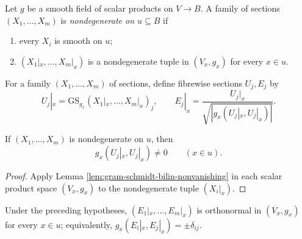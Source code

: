 \begin{definition}
\label{def:local-nondegenerate-family}
\leanok
{}
Let $g$ be a smooth field of scalar products on $V\to B$. A family of sections
$(X_1,\ldots,X_m)$ is \emph{nondegenerate on $u\subseteq B$} if
\begin{enumerate}[label=(\alph*)]
\item every $X_i$ is smooth on $u$;
\item $(X_1|_x,\ldots,X_m|_x)$ is a nondegenerate tuple in $(V_x,g_x)$ for
every $x\in u$.
\end{enumerate}
\end{definition}

\begin{definition}
\label{def:pseudo-gram-schmidt-frame}
\leanok
{}
For a family $(X_1,\ldots,X_m)$ of sections, define fibrewise sections $U_j,E_j$
by
\[
U_j|_x=\mathrm{GS}_{g_x}(X_1|_x,\ldots,X_m|_x)_j,
\qquad
E_j|_x=\frac{U_j|_x}{\sqrt{|g_x(U_j|_x,U_j|_x)|}}.
\]
\end{definition}

\begin{lemma}
\label{lem:pseudo-gram-schmidt-denominators}
\leanok
{}
If $(X_1,\ldots,X_m)$ is nondegenerate on $u$, then
\[
g_x(U_j|_x,U_j|_x)\ne0
\qquad(x\in u).
\]
\end{lemma}

\begin{proof}
\leanok
{}
\sketch Apply Lemma \ref{lem:gram-schmidt-bilin-nonvanishing} in each scalar
product space $(V_x,g_x)$ to the nondegenerate tuple $(X_i|_x)$.
\end{proof}

\begin{proposition}
\label{prop:pseudo-gram-schmidt-frame-orthonormal}
\leanok
{}
Under the preceding hypotheses, $(E_1|_x,\ldots,E_m|_x)$ is orthonormal in
$(V_x,g_x)$ for every $x\in u$; equivalently,
$g_x(E_i|_x,E_j|_x)=\pm\delta_{ij}$.
\end{proposition}

